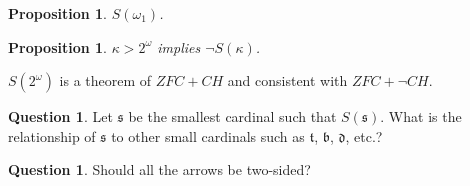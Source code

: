 \documentclass{beamer}
\newtheorem{proposition}[theorem]{Proposition}
\theoremstyle{example}
\theoremstyle{definition}
\newtheorem{question}[theorem]{Question}
\newcommand{\kmarkwin}[1]{\underset{#1\text{-mark}}{\uparrow}}
\newcommand{\ktactwin}[1]{\underset{#1\text{-tact}}{\uparrow}}
\newcommand{\oneptlind}[1]{#1^\dagger} %
\newcommand{\menGame}[1]{Men_{C,F}\left({#1}\right)}
\newcommand{\schFillStrictGame}[1]{Sch^{\cup,\subset}_{C,F}\left({#1}\right)}
\newcommand{\schFillGame}[1]{Sch^{\cup,\subseteq}_{C,F}\left({#1}\right)}
\newcommand{\schFillInitialGame}[1]{Sch^{1,\subseteq}_{C,F}\left({#1}\right)}
\newcommand{\schFillIntGame}[1]{Sch^{\cap}_{C,F}\left({#1}\right)}
\newcommand{\<}{\langle}
\renewcommand{\>}{\rangle}
\newcommand{\alcompS}[1]{S(#1)}
\newcommand{\pl}[1]{\mathscr{#1}}
\begin{document}
\begin{frame}
  \begin{proposition}
    \(\alcompS{\omega_1}\).
  \end{proposition}

  \pause

  \begin{proposition}
    \(\kappa>2^\omega\) implies \(\neg\alcompS\kappa\).
  \end{proposition}

  \pause

  \begin{theorem}
    \(\alcompS{2^\omega}\) is a theorem of \(ZFC+CH\) and consistent with
    \(ZFC+\neg CH\).
  \end{theorem}

  \pause

  \begin{question}
    Let \(\mathfrak s\) be the smallest cardinal such that
    \(\alcompS{\mathfrak s}\). What is the relationship of \(\mathfrak s\)
    to other small cardinals such as
    \(\mathfrak t\), \(\mathfrak b\), \(\mathfrak d\), etc.?
  \end{question}
\end{frame}

\begin{frame}[fragile]
  \begin{theorem}\tiny
  \begin{center}
  \end{center}
  \end{theorem}

  \pause

  \begin{question}
    Should all the arrows be two-sided?
  \end{question}
\end{frame}
\end{document}
